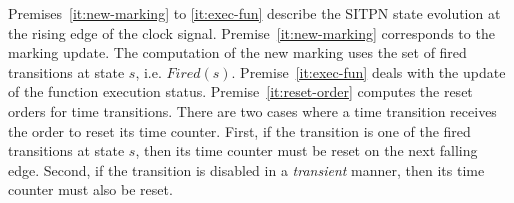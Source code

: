 

Premises~\ref{it:new-marking} to \ref{it:exec-fun} describe the SITPN
state evolution at the rising edge of the clock signal.
Premise~\ref{it:new-marking} corresponds to the marking update. The
computation of the new marking uses the set of fired transitions at
state $s$, i.e. $Fired(s)$. Premise~\ref{it:exec-fun} deals with the
update of the function execution status. Premise~\ref{it:reset-order}
computes the reset orders for time transitions. There are two cases
where a time transition receives the order to reset its time
counter. First, if the transition is one of the fired transitions at
state $s$, then its time counter must be reset on the next falling
edge. Second, if the transition is disabled in a \emph{transient}
manner, then its time counter must also be reset.

